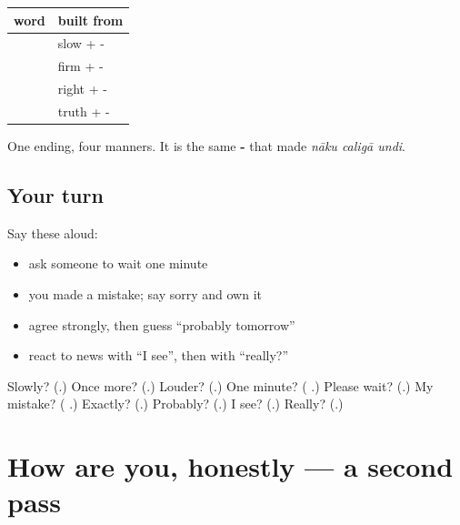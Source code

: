 \begin{grammarlens}[title={Grammar Lens: the ending -\te{గా}}]
\noindent
\begin{tabularx}{\linewidth}{@{}>{\raggedright\arraybackslash}X>{\raggedright\arraybackslash}X@{}}
\toprule
\textbf{word} & \textbf{built from} \\
\midrule
\textbf{\te{నెమ్మదిగా}} & slow + -\te{గా} \\
\textbf{\te{గట్టిగా}} & firm + -\te{గా} \\
\textbf{\te{సరిగ్గా}} & right + -\te{గా} \\
\textbf{\te{నిజంగా}} & truth + -\te{గా} \\
\bottomrule
\end{tabularx}

One ending, four manners. It is the same \textbf{-} that made \emph{nāku caligā undi}.
\end{grammarlens}

\subsection*{Your turn}
Say these aloud:

\begin{itemize}
\raggedright
  \item ask someone to wait one minute
  \item you made a mistake; say sorry and own it
  \item agree strongly, then guess \textquotedblleft{}probably tomorrow\textquotedblright{}
  \item react to news with \textquotedblleft{}I see\textquotedblright{}, then with \textquotedblleft{}really?\textquotedblright{}
\end{itemize}

\begin{tcolorbox}[breakable,colback=teal!4,colframe=teal!35!black,title={Before you move on}]
Slowly? (\textbf{}.) Once more? (\textbf{}.) Louder? (\textbf{}.) One minute? (\textbf{ }.) Please wait? (\textbf{}.) My mistake? (\textbf{ }.) Exactly? (\textbf{}.) Probably? (\textbf{}.) I see? (\textbf{}.) Really? (\textbf{}.)
\end{tcolorbox}
\section[(dialogue)]{How are you, honestly — a second pass}

